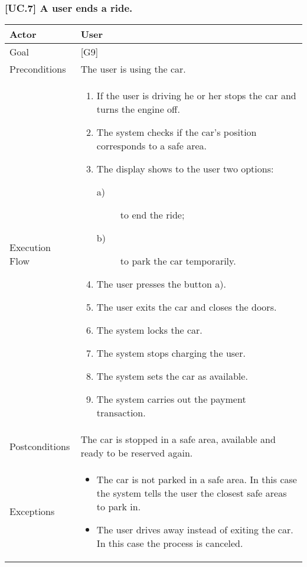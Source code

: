 \documentclass[english]{article}
\begin{document}
	\subsubsection{[UC.7] A user ends a ride.}
	\begin{tabularx}{\textwidth}{  l  X  }
		\hline
		Actor & User\\
		\hline
		Goal & [G9]\\
		\hline
		Preconditions & The user is using the car.\\
		\hline
		Execution Flow & \begin{enumerate}
			\item{If the user is driving he or her stops the car and turns the engine off.}
			\item{The system checks if the car's position corresponds to a safe area.}
			\item{The display shows to the user two options:
				\begin{description}
					\item[a)]{ to end the ride;}
					\item[b)]{ to park the car temporarily.}
				\end{description}}
				\item{The user presses the button a).}
				\item{The user exits the car and closes the doors.}
				\item{The system locks the car.}
				\item{The system stops charging the user.}
				\item{The system sets the car as available.}
				\item{The system carries out the payment transaction.}
			\end{enumerate}\\
			\hline
			Postconditions & The car is stopped in a safe area, available and ready to be reserved again.\\
			\hline
			Exceptions & \begin{itemize}
				\item{The car is not parked in a safe area. In this case the system tells the user the closest safe areas to park in.}
				\item{The user drives away instead of exiting the car. In this case the process is canceled.}
			\end{itemize}\\
			\hline
		\end{tabularx}
\end{document}
